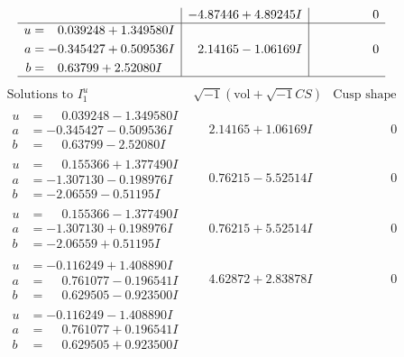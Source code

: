 \documentclass[1p]{elsarticle_modified}
\theoremstyle{definition}
\newcommand{\I}{\sqrt{-1}}
\begin{document}
$$\begin{array}{c|c|c}
 & -4.87446 + 4.89245 I & \phantom{-0.000000 } 0 \\ \hline\begin{aligned}
u &= \phantom{-}0.039248 + 1.349580 I \\
a &= -0.345427 + 0.509536 I \\
b &= \phantom{-}0.63799 + 2.52080 I\end{aligned}
 & \phantom{-}2.14165 - 1.06169 I & \phantom{-0.000000 } 0\\
 \hline 
 \end{array}$$\newpage$$\begin{array}{c|c|c}  
\text{Solutions to }I^u_{1}& \I (\text{vol} + \sqrt{-1}CS) & \text{Cusp shape}\\
 \hline 
\begin{aligned}
u &= \phantom{-}0.039248 - 1.349580 I \\
a &= -0.345427 - 0.509536 I \\
b &= \phantom{-}0.63799 - 2.52080 I\end{aligned}
 & \phantom{-}2.14165 + 1.06169 I & \phantom{-0.000000 } 0 \\ \hline\begin{aligned}
u &= \phantom{-}0.155366 + 1.377490 I \\
a &= -1.307130 - 0.198976 I \\
b &= -2.06559 - 0.51195 I\end{aligned}
 & \phantom{-}0.76215 - 5.52514 I & \phantom{-0.000000 } 0 \\ \hline\begin{aligned}
u &= \phantom{-}0.155366 - 1.377490 I \\
a &= -1.307130 + 0.198976 I \\
b &= -2.06559 + 0.51195 I\end{aligned}
 & \phantom{-}0.76215 + 5.52514 I & \phantom{-0.000000 } 0 \\ \hline\begin{aligned}
u &= -0.116249 + 1.408890 I \\
a &= \phantom{-}0.761077 - 0.196541 I \\
b &= \phantom{-}0.629505 - 0.923500 I\end{aligned}
 & \phantom{-}4.62872 + 2.83878 I & \phantom{-0.000000 } 0 \\ \hline\begin{aligned}
u &= -0.116249 - 1.408890 I \\
a &= \phantom{-}0.761077 + 0.196541 I \\
b &= \phantom{-}0.629505 + 0.923500 I\end{aligned}

\end{array}$$
\end{document}
